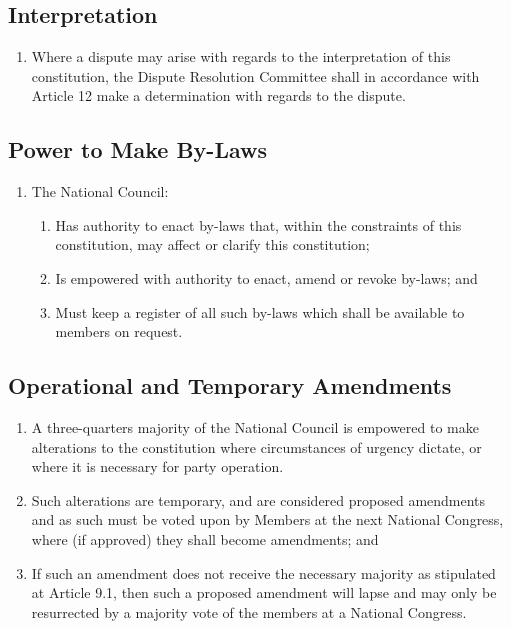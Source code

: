 \documentclass[a4paper,titlepage,8.5pt]{article}
\begin{document}
\subsection{Interpretation}

\begin{enumerate}
\item Where a dispute may arise with regards to the interpretation of this constitution, the Dispute Resolution Committee shall in accordance with Article 12 make a determination with regards to the dispute.
\end{enumerate}

\subsection{Power to Make By-Laws}

\begin{enumerate}
\item The National Council:
\begin{enumerate}
\item Has authority to enact by-laws that, within the constraints of this constitution, may affect or clarify this constitution;
\item Is empowered with authority to enact, amend or revoke by-laws; and
\item Must keep a register of all such by-laws which shall be available to members on request.
\end{enumerate}
\end{enumerate}

\subsection{Operational and Temporary Amendments}

\begin{enumerate}
\item A three-quarters majority of the National Council is empowered to make alterations to the constitution where circumstances of urgency dictate, or where it is necessary for party operation.
\item Such alterations are temporary, and are considered proposed amendments and as such must be voted upon by Members at the next National Congress, where (if approved) they shall become amendments; and
\item If such an amendment does not receive the necessary majority as stipulated at Article 9.1, then such a proposed amendment will lapse and may only be resurrected by a majority vote of the members at a National Congress.
\end{enumerate}
\end{document}
